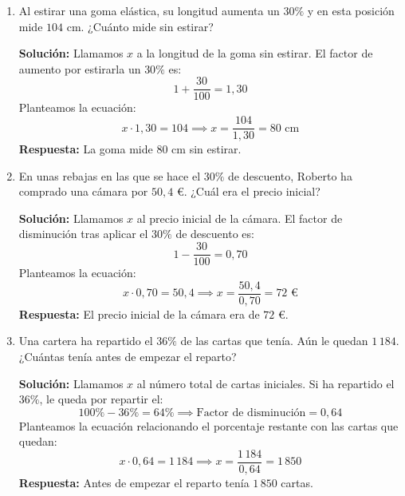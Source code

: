 \documentclass[a4paper,12pt]{article}
\begin{document}
\begin{enumerate}
        \textbf{Solución:}
        Llamamos $x$ al precio inicial sin IVA. El factor de aumento por aplicar el $21\%$ de IVA es:
        \[
        1 + \frac{21}{100} = 1{,}21
        \]
        Planteamos la ecuación multiplicando el precio inicial por el factor de aumento:
        \[
        x \cdot 1{,}21 = 72{,}6 \implies x = \frac{72{,}6}{1{,}21} = 60\text{ €}
        \]
        \textbf{Respuesta:} El precio de la batidora antes de impuestos era de $60\text{ €}$.

    \item Al estirar una goma elástica, su longitud aumenta un $30\%$ y en esta posición mide $104\text{ cm}$. ¿Cuánto mide sin estirar?
    
        \textbf{Solución:}
        Llamamos $x$ a la longitud de la goma sin estirar. El factor de aumento por estirarla un $30\%$ es:
        \[
        1 + \frac{30}{100} = 1{,}30
        \]
        Planteamos la ecuación:
        \[
        x \cdot 1{,}30 = 104 \implies x = \frac{104}{1{,}30} = 80\text{ cm}
        \]
        \textbf{Respuesta:} La goma mide $80\text{ cm}$ sin estirar.

    \item En unas rebajas en las que se hace el $30\%$ de descuento, Roberto ha comprado una cámara por $50{,}4\text{ €}$. ¿Cuál era el precio inicial?
    
        \textbf{Solución:}
        Llamamos $x$ al precio inicial de la cámara. El factor de disminución tras aplicar el $30\%$ de descuento es:
        \[
        1 - \frac{30}{100} = 0{,}70
        \]
        Planteamos la ecuación:
        \[
        x \cdot 0{,}70 = 50{,}4 \implies x = \frac{50{,}4}{0{,}70} = 72\text{ €}
        \]
        \textbf{Respuesta:} El precio inicial de la cámara era de $72\text{ €}$.

    \item Una cartera ha repartido el $36\%$ de las cartas que tenía. Aún le quedan $1\,184$. ¿Cuántas tenía antes de empezar el reparto?
    
        \textbf{Solución:}
        Llamamos $x$ al número total de cartas iniciales. Si ha repartido el $36\%$, le queda por repartir el:
        \[
        100\% - 36\% = 64\% \implies \text{Factor de disminución} = 0{,}64
        \]
        Planteamos la ecuación relacionando el porcentaje restante con las cartas que quedan:
        \[
        x \cdot 0{,}64 = 1\,184 \implies x = \frac{1\,184}{0{,}64} = 1\,850
        \]
        \textbf{Respuesta:} Antes de empezar el reparto tenía $1\,850$ cartas.


\end{enumerate}
\end{document}
